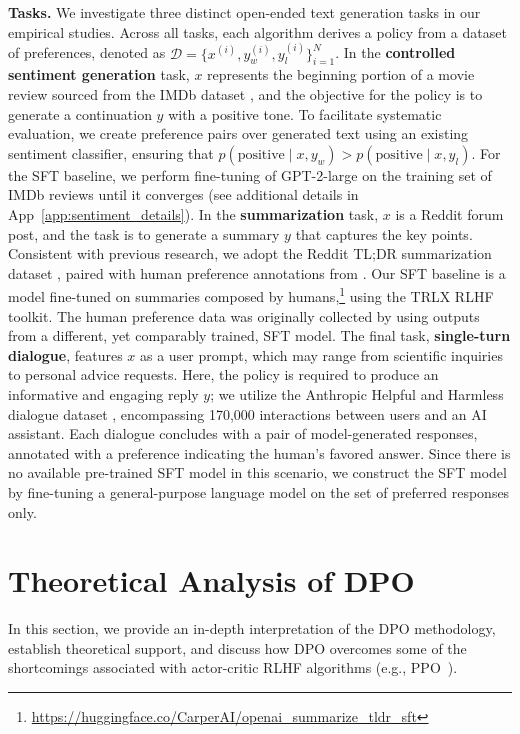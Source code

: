 \textbf{Tasks.} We investigate three distinct open-ended text generation tasks in our empirical studies. Across all tasks, each algorithm derives a policy from a dataset of preferences, denoted as $\mathcal{D}=\bigl\{x^{(i)}, y_w^{(i)}, y_l^{(i)}\bigr\}_{i=1}^N$. In the \textbf{controlled sentiment generation} task, $x$ represents the beginning portion of a movie review sourced from the IMDb dataset \cite{maas-EtAl:2011:ACL-HLT2011}, and the objective for the policy is to generate a continuation $y$ with a positive tone. To facilitate systematic evaluation, we create preference pairs over generated text using an existing sentiment classifier, ensuring that $p(\text{positive}\mid x,y_w)>p(\text{positive}\mid x,y_l)$. For the SFT baseline, we perform fine-tuning of GPT-2-large on the training set of IMDb reviews until it converges (see additional details in App~\ref{app:sentiment_details}). In the \textbf{summarization} task, $x$ is a Reddit forum post, and the task is to generate a summary $y$ that captures the key points. Consistent with previous research, we adopt the Reddit TL;DR summarization dataset \citep{volske-etal-2017-tl}, paired with human preference annotations from \citeauthor{stiennon2022learning}. Our SFT baseline is a model fine-tuned on summaries composed by humans,\footnote{\url{https://huggingface.co/CarperAI/openai_summarize_tldr_sft}} using the TRLX \citep{leandro_von_werra_2023_7790115} RLHF toolkit. The human preference data was originally collected by \citeauthor{stiennon2022learning} using outputs from a different, yet comparably trained, SFT model. The final task, \textbf{single-turn dialogue}, features $x$ as a user prompt, which may range from scientific inquiries to personal advice requests. Here, the policy is required to produce an informative and engaging reply $y$; we utilize the Anthropic Helpful and Harmless dialogue dataset \citep{bai2022training}, encompassing 170,000 interactions between users and an AI assistant. Each dialogue concludes with a pair of model-generated responses, annotated with a preference indicating the human’s favored answer. Since there is no available pre-trained SFT model in this scenario, we construct the SFT model by fine-tuning a general-purpose language model on the set of preferred responses only.

\section{Theoretical Analysis of DPO} In this section, we provide an in-depth interpretation of the DPO methodology, establish theoretical support, and discuss how DPO overcomes some of the shortcomings associated with actor-critic RLHF algorithms (e.g., PPO~\cite{schulman2017proximal}).

